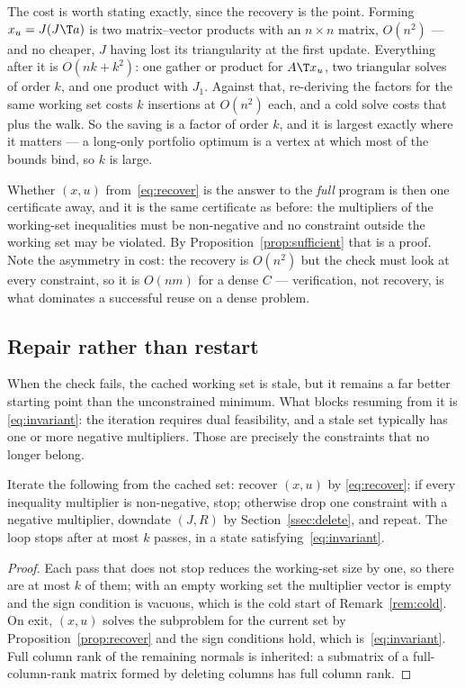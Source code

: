 The cost is worth stating exactly, since the recovery is the point. Forming
$x_u = J(J\T a)$ is two matrix--vector products with an $n \times n$ matrix,
$O(n^2)$ --- and no cheaper, $J$ having lost its triangularity at the first
update. Everything after it is $O(nk + k^2)$: one gather or product for
$A\T x_u$, two triangular solves of order $k$, and one product with $J_1$.
Against that, re-deriving the factors for the same working set costs $k$
insertions at $O(n^2)$ each, and a cold solve costs that plus the walk. So the
saving is a factor of order $k$, and it is largest exactly where it matters ---
a long-only portfolio optimum is a vertex at which most of the bounds bind, so $k$
is large.

Whether $(x,u)$ from~\eqref{eq:recover} is the answer to the \emph{full} program
is then one certificate away, and it is the same certificate as before: the
multipliers of the working-set inequalities must be non-negative and no constraint
outside the working set may be violated. By
Proposition~\ref{prop:sufficient} that is a proof. Note the asymmetry in cost: the
recovery is $O(n^2)$ but the check must look at every constraint, so it is
$O(nm)$ for a dense $C$ --- verification, not recovery, is what dominates a
successful reuse on a dense problem.

\subsection{Repair rather than restart}

When the check fails, the cached working set is stale, but it remains a far better
starting point than the unconstrained minimum. What blocks resuming from it is
\eqref{eq:invariant}: the iteration requires dual feasibility, and a stale set
typically has one or more negative multipliers. Those are precisely the
constraints that no longer belong.

\begin{proposition}\label{prop:repair}
Iterate the following from the cached set: recover $(x,u)$ by
\eqref{eq:recover}; if every inequality multiplier is non-negative, stop;
otherwise drop one constraint with a negative multiplier, downdate $(J,R)$ by
Section~\ref{ssec:delete}, and repeat. The loop stops after at most $k$ passes, in
a state satisfying~\eqref{eq:invariant}.
\end{proposition}

\begin{proof}
Each pass that does not stop reduces the working-set size by one, so there are at
most $k$ of them; with an empty working set the multiplier vector is empty and the
sign condition is vacuous, which is the cold start of Remark~\ref{rem:cold}.
On exit, $(x,u)$ solves the subproblem for the current set by
Proposition~\ref{prop:recover} and the sign conditions hold, which
is~\eqref{eq:invariant}. Full column rank of the remaining normals is inherited:
a submatrix of a full-column-rank matrix formed by deleting columns has full
column rank.
\end{proof}


